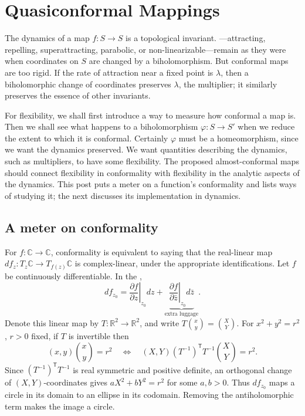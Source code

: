 \documentclass[11pt,a4paper]{article}
\begin{document}
\section*{Quasiconformal Mappings}
The dynamics of a map \(f:S\to S\) is a topological invariant. ---attracting, repelling, superattracting, parabolic, or non-linearizable---remain as they were when coordinates on \(S\) are changed by a biholomorphism.
But conformal maps are too rigid. If the rate of attraction near a fixed point is \(\lambda\), then a biholomorphic change of coordinates preserves \(\lambda\), the multiplier; it similarly preserves the essence of other invariants.

For flexibility, we shall first introduce a way to measure how conformal a map is. Then we shall see what happens to a biholomorphism $\varphi:S\to S'$ when we reduce the extent to which it is conformal. Certainly $\varphi$ must be a homeomorphism, since we want the dynamics preserved. We want quantities describing the dynamics, such as multipliers, to have some flexibility. The proposed almost-conformal maps should connect flexibility in conformality with flexibility in the analytic aspects of the dynamics.
This post puts a meter on a function's conformality and lists ways of studying it; the next discusses its implementation in dynamics.

\subsection{A meter on conformality}
For \(f:\mathbb C\to\mathbb C\), conformality is equivalent to saying that the real-linear map \(df_z:T_z\mathbb C\to T_{f(z)}\mathbb C\) is complex-linear, under the appropriate identifications.
Let \(f\) be continuously differentiable. In the ,
\[
df_{z_0}=\left.\frac{\partial f}{\partial z}\right|_{z_0}dz
+\underbrace{\left.\frac{\partial f}{\partial\bar z}\right|_{z_0}d\bar z}_{\text{extra luggage}}.
\]
Denote this linear map by \(T:\mathbb R^2\to\mathbb R^2\), and write
\(T\binom{x}{y}=\binom XY\). For \(x^2+y^2=r^2\), \(r>0\) fixed, if \(T\) is invertible then
\[
(x,y)\binom xy=r^2
\quad\Longleftrightarrow\quad
(X,Y)(T^{-1})^{\mathsf T}T^{-1}\binom XY=r^2.
\]
Since \((T^{-1})^{\mathsf T}T^{-1}\) is real symmetric and positive definite, an orthogonal change of \((X,Y)\)-coordinates gives \(aX^2+bY^2=r^2\) for some \(a,b>0\).
Thus \(df_{z_0}\) maps a circle in its domain to an ellipse in its codomain. Removing the antiholomorphic term makes the image a circle.
\end{document}

